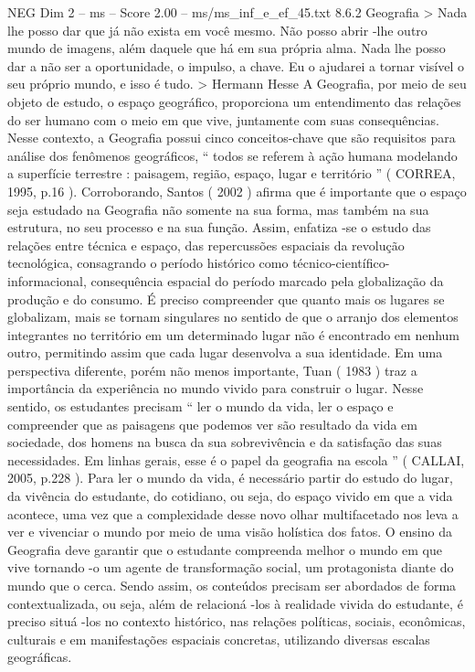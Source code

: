 \begin{textsample}{NEG Dim 2 – ms – Score 2.00 – ms/ms\_inf\_e\_ef\_45.txt}  \label{ex:f2_neg_248}
8.6.2 Geografia > Nada lhe posso dar que já não exista em você mesmo.
Não posso abrir -lhe outro mundo de imagens, além daquele que há em sua própria alma.
Nada lhe posso dar a não ser a oportunidade, o impulso, a chave.
Eu o ajudarei a tornar visível o seu próprio mundo, e isso é tudo. > Hermann Hesse A Geografia, por meio de seu objeto de estudo, o espaço geográfico, proporciona um entendimento das relações do ser humano com o meio em que vive, juntamente com suas consequências.
Nesse contexto, a Geografia possui cinco conceitos-chave que são requisitos para análise dos fenômenos geográficos, “ todos se referem à ação humana modelando a superfície terrestre : paisagem, região, espaço, lugar e território ” ( CORREA, 1995, p.16 ).
Corroborando, Santos ( 2002 ) afirma que é importante que o espaço seja estudado na Geografia não somente na sua forma, mas também na sua estrutura, no seu processo e na sua função.
Assim, enfatiza -se o estudo das relações entre técnica e espaço, das repercussões espaciais da revolução tecnológica, consagrando o período histórico como técnico-científico-informacional, consequência espacial do período marcado pela globalização da produção e do consumo.
É preciso compreender que quanto mais os lugares se globalizam, mais se tornam singulares no sentido de que o arranjo dos elementos integrantes no território em um determinado lugar não é encontrado em nenhum outro, permitindo assim que cada lugar desenvolva a sua identidade.
Em uma perspectiva diferente, porém não menos importante, Tuan ( 1983 ) traz a importância da experiência no mundo vivido para construir o lugar.
Nesse sentido, os estudantes precisam “ ler o mundo da vida, ler o espaço e compreender que as paisagens que podemos ver são resultado da vida em sociedade, dos homens na busca da sua sobrevivência e da satisfação das suas necessidades.
Em linhas gerais, esse é o papel da geografia na escola ” ( CALLAI, 2005, p.228 ).
Para ler o mundo da vida, é necessário partir do estudo do lugar, da vivência do estudante, do cotidiano, ou seja, do espaço vivido em que a vida acontece, uma vez que a complexidade desse novo olhar multifacetado nos leva a ver e vivenciar o mundo por meio de uma visão holística dos fatos.
O ensino da Geografia deve garantir que o estudante compreenda melhor o mundo em que vive tornando -o um agente de transformação social, um protagonista diante do mundo que o cerca.
Sendo assim, os conteúdos precisam ser abordados de forma contextualizada, ou seja, além de relacioná -los à realidade vivida do estudante, é preciso situá -los no contexto histórico, nas relações políticas, sociais, econômicas, culturais e em manifestações espaciais concretas, utilizando diversas escalas geográficas.

\end{textsample}
